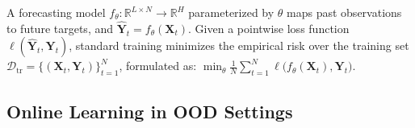 ﻿\documentclass[journal]{IEEEtran}
\newenvironment{auditproblemblock}{\begingroup\color{red}}{\endgroup}
\begin{document}
\begin{auditproblemblock}
A forecasting model $f_{\theta}: \mathbb{R}^{L \times N} \rightarrow \mathbb{R}^{H}$ parameterized by $\theta$ maps past observations to future targets, and $\widehat{\mathbf{Y}}_t = f_{\theta}(\mathbf{X}_t)$. Given a pointwise loss function $\ell(\widehat{\mathbf{Y}}_t,\mathbf{Y}_t)$, standard training minimizes the empirical risk over the training set $\mathcal{D}_{\mathrm{tr}}=\{(\mathbf{X}_t,\mathbf{Y}_t)\}_{t=1}^{N}$, formulated as:  $\min_{\theta}\frac{1}{N}\sum_{t=1}^{N}\ell\big(f_{\theta}(\mathbf{X}_t),\mathbf{Y}_t\big)$.
\end{auditproblemblock}

\subsection{Online Learning in OOD Settings}
\end{document}
